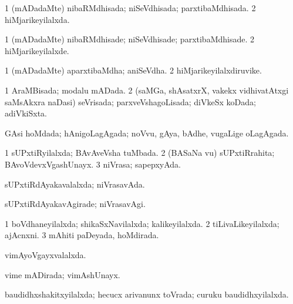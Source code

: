\bentry
{} 
\gl{\gu}
\expl{}
\bmng
\bnum
\num{1} (mADadaMte) nibaRMdhisada; niSeVdhisada; parxtibaMdhisada. 
\num{2} hiMjarikeyilalxda. 
\enum
\emng
\eentry

\bentry
{} 
\gl{\kirxvi}
\expl{}
\bmng
\bnum
\num{1} (mADadaMte) nibaRMdhisade; niSeVdhisade; parxtibaMdhisade. 
\num{2} hiMjarikeyilalxde. 
\enum
\emng
\eentry

\bentry
{} 
\gl{\nA}
\expl{}
\bmng
\bnum
\num{1} (mADadaMte) aparxtibaMdha; aniSeVdha. 
\num{2} hiMjarikeyilalxdiruvike. 
\enum
\emng
\eentry

\bentry
{} 
\gl{\gu}
\expl{}
\bmng
\bnum
\num{1} AraMBisada; modalu mADada. 
\num{2} (saMGa, shAsatxrX, \mo vakekx vidhivatAtxgi saMsAkxra naDasi) seVrisada; parxveVshagoLisada; diVkeSx koDada; adiVkiSxta. 
\enum
\emng
\eentry

\bentry
{} 
\gl{\gu}
\expl{}
\bmng
GAsi hoMdada; hAnigoLagAgada; noVvu, gAya, bAdhe, \mo vugaLige oLagAgada. 
\emng
\eentry

\bentry
{} 
\gl{\gu}
\expl{}
\bmng
\bnum
\num{1} sUPxtiRyilalxda; BAvAveVsha tuMbada. 
\num{2} (BASaNa \mo vu) sUPxtiRrahita; BAvoVdevxVgashUnayx. 
\num{3} niVrasa; sapepxyAda. 
\enum
\emng
\eentry

\bentry
{} 
\gl{\gu}
\expl{}
\bmng
sUPxtiRdAyakavalalxda; niVrasavAda. 
\emng
\eentry

\bentry
{} 
\gl{\kirxvi}
\expl{}
\bmng
sUPxtiRdAyakavAgirade; niVrasavAgi. 
\emng
\eentry

\bentry
{} 
\gl{\gu}
\expl{}
\bmng
\bnum
\num{1} boVdhaneyilalxda; shikaSxNavilalxda; kalikeyilalxda. 
\num{2} tiLivaLikeyilalxda; ajAcnxni. 
\num{3} mAhiti paDeyada, hoMdirada. 
\enum
\emng
\eentry

\bentry
{} 
\gl{\gu}
\expl{}
\bmng
vimAyoVgayxvalalxda. 
\emng
\eentry

\bentry
{} 
\gl{\gu}
\expl{}
\bmng
vime mADirada; vimAshUnayx. 
\emng
\eentry

\bentry
{} 
\gl{\gu}
\expl{}
\bmng
baudidhxshakitxyilalxda; hecucx arivanunx toVrada; curuku baudidhxyilalxda. 
\emng
\eentry

